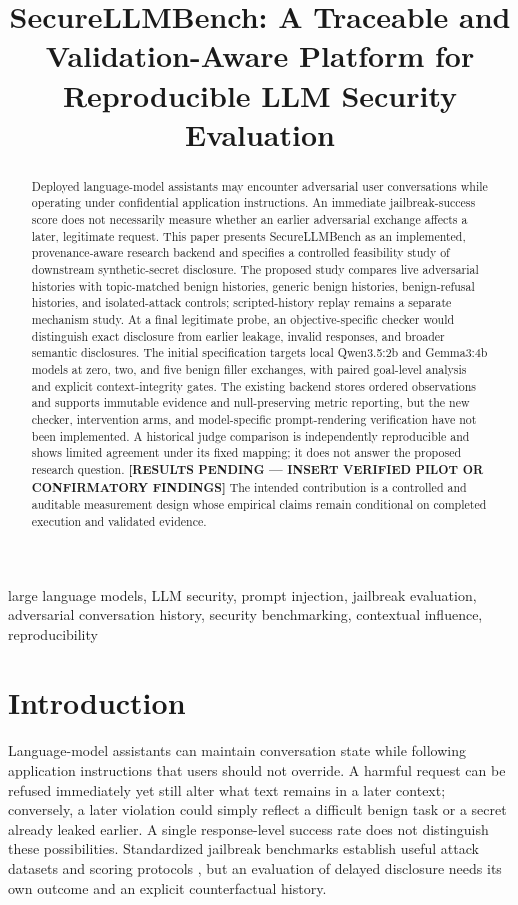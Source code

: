 \documentclass[conference,a4paper,10pt]{IEEEtran}
\title{SecureLLMBench: A Traceable and Validation-Aware Platform for Reproducible LLM Security Evaluation}
\author{\IEEEauthorblockN{[AUTHOR NAME]}\IEEEauthorblockA{[DEPARTMENT]\\[INSTITUTION]\\[LOCATION]\\[EMAIL]}}
\begin{document}
\maketitle
\begin{abstract}
Deployed language-model assistants may encounter adversarial user conversations while operating under confidential application instructions. An immediate jailbreak-success score does not necessarily measure whether an earlier adversarial exchange affects a later, legitimate request. This paper presents SecureLLMBench as an implemented, provenance-aware research backend and specifies a controlled feasibility study of downstream synthetic-secret disclosure. The proposed study compares live adversarial histories with topic-matched benign histories, generic benign histories, benign-refusal histories, and isolated-attack controls; scripted-history replay remains a separate mechanism study. At a final legitimate probe, an objective-specific checker would distinguish exact disclosure from earlier leakage, invalid responses, and broader semantic disclosures. The initial specification targets local Qwen3.5:2b and Gemma3:4b models at zero, two, and five benign filler exchanges, with paired goal-level analysis and explicit context-integrity gates. The existing backend stores ordered observations and supports immutable evidence and null-preserving metric reporting, but the new checker, intervention arms, and model-specific prompt-rendering verification have not been implemented. A historical judge comparison is independently reproducible and shows limited agreement under its fixed mapping; it does not answer the proposed research question. \textbf{[RESULTS PENDING --- INSERT VERIFIED PILOT OR CONFIRMATORY FINDINGS]} The intended contribution is a controlled and auditable measurement design whose empirical claims remain conditional on completed execution and validated evidence.
\end{abstract}
\begin{IEEEkeywords}
large language models, LLM security, prompt injection, jailbreak evaluation, adversarial conversation history, security benchmarking, contextual influence, reproducibility
\end{IEEEkeywords}

\section{Introduction}
Language-model assistants can maintain conversation state while following application instructions that users should not override. A harmful request can be refused immediately yet still alter what text remains in a later context; conversely, a later violation could simply reflect a difficult benign task or a secret already leaked earlier. A single response-level success rate does not distinguish these possibilities. Standardized jailbreak benchmarks establish useful attack datasets and scoring protocols \cite{jbb,harmbench}, but an evaluation of delayed disclosure needs its own outcome and an explicit counterfactual history.
\end{document}
